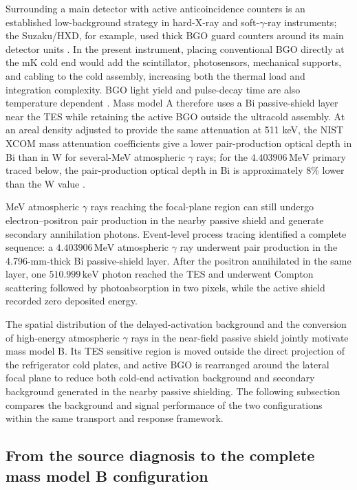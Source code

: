 \documentclass[11pt]{article}
\newcommand{\keV}{\ensuremath{\,\mathrm{keV}}}
\newcommand{\MeV}{\ensuremath{\,\mathrm{MeV}}}
\begin{document}
Surrounding a main detector with active anticoincidence counters is an established low-background strategy in hard-X-ray and soft-$\gamma$-ray instruments; the Suzaku/HXD, for example, used thick BGO guard counters around its main detector units \cite{Takahashi2007HXD}. In the present instrument, placing conventional BGO directly at the mK cold end would add the scintillator, photosensors, mechanical supports, and cabling to the cold assembly, increasing both the thermal load and integration complexity. BGO light yield and pulse-decay time are also temperature dependent \cite{Verdier2011BGO}. Mass model A therefore uses a Bi passive-shield layer near the TES while retaining the active BGO outside the ultracold assembly. At an areal density adjusted to provide the same attenuation at 511 keV, the NIST XCOM mass attenuation coefficients give a lower pair-production optical depth in Bi than in W for several-MeV atmospheric $\gamma$ rays; for the $4.403906\MeV$ primary traced below, the pair-production optical depth in Bi is approximately 8\% lower than the W value \cite{NISTXCOM}.

MeV atmospheric $\gamma$ rays reaching the focal-plane region can still undergo electron--positron pair production in the nearby passive shield and generate secondary annihilation photons. Event-level process tracing identified a complete sequence: a $4.403906\MeV$ atmospheric $\gamma$ ray underwent pair production in the 4.796-mm-thick Bi passive-shield layer. After the positron annihilated in the same layer, one $510.999\keV$ photon reached the TES and underwent Compton scattering followed by photoabsorption in two pixels, while the active shield recorded zero deposited energy.

The spatial distribution of the delayed-activation background and the conversion of high-energy atmospheric $\gamma$ rays in the near-field passive shield jointly motivate mass model B. Its TES sensitive region is moved outside the direct projection of the refrigerator cold plates, and active BGO is rearranged around the lateral focal plane to reduce both cold-end activation background and secondary background generated in the nearby passive shielding. The following subsection compares the background and signal performance of the two configurations within the same transport and response framework.
\endgroup

\FloatBarrier

\subsection{From the source diagnosis to the complete mass model B configuration}
\label{subsec:optimized_shield_results}
\end{document}
